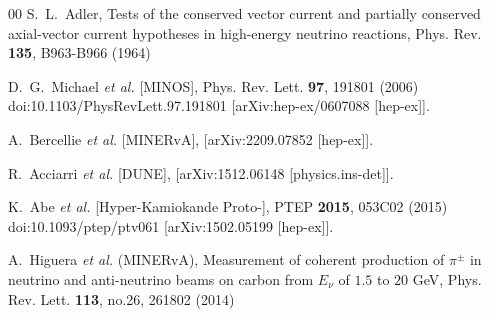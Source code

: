 \documentclass[aps,prl,twocolumn,superscriptaddress,nofootinbib]{revtex4-1}
\begin{document}
\begin{thebibliography}{00}
S.~L.~Adler,
Tests of the conserved vector current and partially conserved axial-vector current hypotheses in high-energy neutrino reactions,
Phys. Rev. \textbf{135}, B963-B966 (1964)

D.~G.~Michael \textit{et al.} [MINOS],
Phys. Rev. Lett. \textbf{97}, 191801 (2006)
doi:10.1103/PhysRevLett.97.191801
[arXiv:hep-ex/0607088 [hep-ex]].

A.~Bercellie \textit{et al.} [MINERvA],
[arXiv:2209.07852 [hep-ex]].

R.~Acciarri \textit{et al.} [DUNE],
[arXiv:1512.06148 [physics.ins-det]].

K.~Abe \textit{et al.} [Hyper-Kamiokande Proto-],
PTEP \textbf{2015}, 053C02 (2015)
doi:10.1093/ptep/ptv061
[arXiv:1502.05199 [hep-ex]].

A.~Higuera \textit{et al.} (MINERvA),
Measurement of coherent production of $\pi^\pm$ in neutrino and anti-neutrino beams on carbon from $E_\nu$ of $1.5$ to $20$ GeV,
Phys. Rev. Lett. \textbf{113}, no.26, 261802 (2014)


\end{thebibliography}
\end{document}
